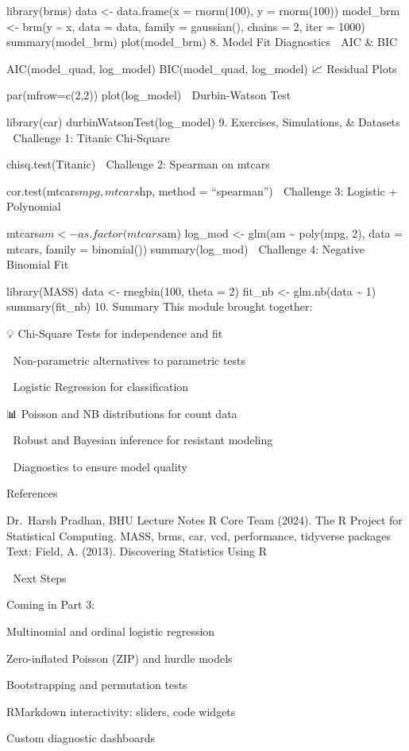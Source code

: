 \documentclass[
  letterpaper,
  DIV=11,
  numbers=noendperiod]{scrreprt}
\begin{document}
library(brms) data \textless- data.frame(x = rnorm(100), y = rnorm(100))
model\_brm \textless- brm(y \textasciitilde{} x, data = data, family =
gaussian(), chains = 2, iter = 1000) summary(model\_brm)
plot(model\_brm) 8. Model Fit Diagnostics 🔎 AIC \& BIC

AIC(model\_quad, log\_model) BIC(model\_quad, log\_model) 📈 Residual
Plots

par(mfrow=c(2,2)) plot(log\_model) 🧪 Durbin-Watson Test

library(car) durbinWatsonTest(log\_model) 9. Exercises, Simulations, \&
Datasets 🧠 Challenge 1: Titanic Chi-Square

chisq.test(Titanic) 🧠 Challenge 2: Spearman on mtcars

cor.test(mtcars\(mpg, mtcars\)hp, method = ``spearman'') 🧠 Challenge 3:
Logistic + Polynomial

mtcars\(am <- as.factor(mtcars\)am) log\_mod \textless- glm(am
\textasciitilde{} poly(mpg, 2), data = mtcars, family = binomial())
summary(log\_mod) 🧠 Challenge 4: Negative Binomial Fit

library(MASS) data \textless- rnegbin(100, theta = 2) fit\_nb \textless-
glm.nb(data \textasciitilde{} 1) summary(fit\_nb) 10. Summary This
module brought together:

💡 Chi-Square Tests for independence and fit

🧱 Non-parametric alternatives to parametric tests

🔁 Logistic Regression for classification

📊 Poisson and NB distributions for count data

🧠 Robust and Bayesian inference for resistant modeling

🧪 Diagnostics to ensure model quality

References

Dr.~Harsh Pradhan, BHU Lecture Notes R Core Team (2024). The R Project
for Statistical Computing. MASS, brms, car, vcd, performance, tidyverse
packages Text: Field, A. (2013). Discovering Statistics Using R

🚀 Next Steps

Coming in Part 3:

Multinomial and ordinal logistic regression

Zero-inflated Poisson (ZIP) and hurdle models

Bootstrapping and permutation tests

RMarkdown interactivity: sliders, code widgets

Custom diagnostic dashboards
\end{document}
